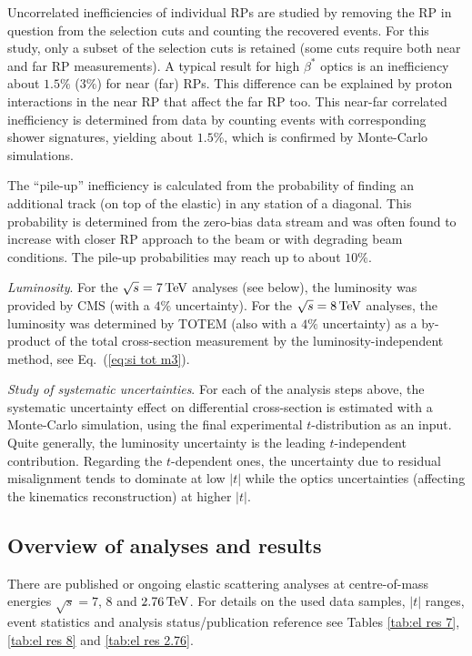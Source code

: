 \documentclass{desyproc}
\def\un#1{\,{\rm #1}}
\begin{document}
Uncorrelated inefficiencies of individual RPs are studied by removing the RP in question from the selection cuts and counting the recovered events. For this study, only a subset of the selection cuts is retained (some cuts require both near and far RP measurements). A typical result for high $\beta^*$ optics is an inefficiency about $1.5\%$ ($3\%$) for near (far) RPs. This difference can be explained by proton interactions in the near RP that affect the far RP too. This near-far correlated inefficiency is determined from data by counting events with corresponding shower signatures, yielding about $1.5\%$, which is confirmed by Monte-Carlo simulations.

The ``pile-up'' inefficiency is calculated from the probability of finding an additional track (on top of the elastic) in any station of a diagonal. This probability is determined from the zero-bias data stream and was often found to increase with closer RP approach to the beam or with degrading beam conditions. The pile-up probabilities may reach up to about $10\%$.

{\em Luminosity}. For the $\sqrt s = 7\un{TeV}$ analyses (see below), the luminosity was provided by CMS (with a $4\%$ uncertainty). For the $\sqrt s = 8\un{TeV}$ analyses, the luminosity was determined by TOTEM (also with a $4\%$ uncertainty) as a by-product of the total cross-section measurement by the luminosity-independent method, see Eq.~(\ref{eq:si tot m3}).

{\em Study of systematic uncertainties}. For each of the analysis steps above, the systematic uncertainty effect
on differential cross-section is estimated with a Monte-Carlo simulation, using the final experimental $t$-distribution as an input. Quite generally, the luminosity uncertainty is the leading $t$-independent contribution. Regarding the $t$-dependent ones, the uncertainty due to residual misalignment tends to dominate at low $|t|$ while the optics uncertainties (affecting the kinematics reconstruction) at higher $|t|$.


\subsection{Overview of analyses and results}

There are published or ongoing elastic scattering analyses at centre-of-mass energies $\sqrt s = 7$, $8$ and $2.76\un{TeV}$. For details on the used data samples, $|t|$ ranges, event statistics and analysis status/publication reference see Tables \ref{tab:el res 7}, \ref{tab:el res 8} and \ref{tab:el res 2.76}.
\end{document}
